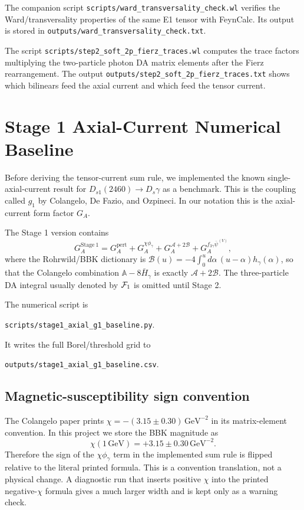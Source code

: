 \documentclass[11pt]{article}
\begin{document}
The companion script \texttt{scripts/ward\_transversality\_check.wl} verifies
the Ward/transversality properties of the same E1 tensor with FeynCalc.  Its
output is stored in
\texttt{outputs/ward\_transversality\_check.txt}.

The script \texttt{scripts/step2\_soft\_2p\_fierz\_traces.wl} computes the
trace factors multiplying the two-particle photon DA matrix elements after the
Fierz rearrangement.  The output
\texttt{outputs/step2\_soft\_2p\_fierz\_traces.txt} shows which bilinears feed
the axial current and which feed the tensor current.

\section{Stage 1 Axial-Current Numerical Baseline}

Before deriving the tensor-current sum rule, we implemented the known
single-axial-current result for
$D_{s1}(2460)\to D_s\gamma$ as a benchmark.  This is the coupling called
$g_1$ by Colangelo, De Fazio, and Ozpineci.  In our notation this is the
axial-current form factor $G_A$.

The Stage 1 version contains
\begin{equation}
  G_A^{\mathrm{Stage\ 1}}
  =
  G_A^{\mathrm{pert}}
  +
  G_A^{\chi\phi_\gamma}
  +
  G_A^{\mathcal A+2\mathcal B}
  +
  G_A^{f_{3\gamma}\overline\psi^{(V)}},
\end{equation}
where the Rohrwild/BBK dictionary is
$\mathcal B(u)=-4\int_0^u d\alpha\,(u-\alpha)h_\gamma(\alpha)$, so that the
Colangelo combination
$\mathbb A-8\bar H_\gamma$ is exactly $\mathcal A+2\mathcal B$.
The three-particle DA integral usually denoted by ${\cal F}_1$ is omitted
until Stage 2.

The numerical script is
\begin{center}
  \texttt{scripts/stage1\_axial\_g1\_baseline.py}.
\end{center}
It writes the full Borel/threshold grid to
\begin{center}
  \texttt{outputs/stage1\_axial\_g1\_baseline.csv}.
\end{center}

\subsection{Magnetic-susceptibility sign convention}

The Colangelo paper prints $\chi=-(3.15\pm0.30)\,\mathrm{GeV}^{-2}$ in its
matrix-element convention.  In this project we store the BBK magnitude as
\begin{equation}
  \chi(1\,\mathrm{GeV})=+3.15\pm0.30\,\mathrm{GeV}^{-2}.
\end{equation}
Therefore the sign of the $\chi\phi_\gamma$ term in the implemented sum rule is
flipped relative to the literal printed formula.  This is a convention
translation, not a physical change.  A diagnostic run that inserts positive
$\chi$ into the printed negative-$\chi$ formula gives a much larger width and is
kept only as a warning check.
\end{document}

